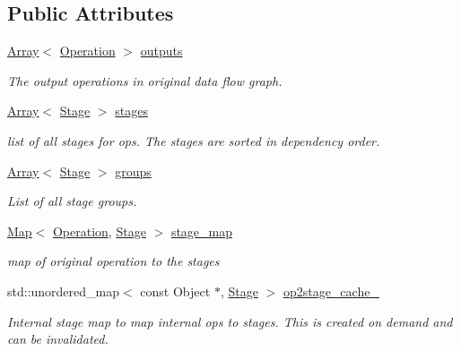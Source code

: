 \subsection*{Public Attributes}
\begin{DoxyCompactItemize}
\item 
\hyperlink{classtvm_1_1Array}{Array}$<$ \hyperlink{classtvm_1_1te_1_1Operation}{Operation} $>$ \hyperlink{classtvm_1_1te_1_1ScheduleNode_a27b0f687f7b20fcc6416a49e041712d8}{outputs}
\begin{DoxyCompactList}\small\item\em The output operations in original data flow graph. \end{DoxyCompactList}\item 
\hyperlink{classtvm_1_1Array}{Array}$<$ \hyperlink{classtvm_1_1te_1_1Stage}{Stage} $>$ \hyperlink{classtvm_1_1te_1_1ScheduleNode_ab5649969db603d6b7b4d155c0d09cdd5}{stages}
\begin{DoxyCompactList}\small\item\em list of all stages for ops. The stages are sorted in dependency order. \end{DoxyCompactList}\item 
\hyperlink{classtvm_1_1Array}{Array}$<$ \hyperlink{classtvm_1_1te_1_1Stage}{Stage} $>$ \hyperlink{classtvm_1_1te_1_1ScheduleNode_ab2020fcfbb6fd3c216bb09455697452f}{groups}
\begin{DoxyCompactList}\small\item\em List of all stage groups. \end{DoxyCompactList}\item 
\hyperlink{classtvm_1_1Map}{Map}$<$ \hyperlink{classtvm_1_1te_1_1Operation}{Operation}, \hyperlink{classtvm_1_1te_1_1Stage}{Stage} $>$ \hyperlink{classtvm_1_1te_1_1ScheduleNode_a612223aec2751cbd035a18c9e5453085}{stage\+\_\+map}
\begin{DoxyCompactList}\small\item\em map of original operation to the stages \end{DoxyCompactList}\item 
std\+::unordered\+\_\+map$<$ const Object $\ast$, \hyperlink{classtvm_1_1te_1_1Stage}{Stage} $>$ \hyperlink{classtvm_1_1te_1_1ScheduleNode_adbc8bfb6812add2173dcc7a6adb85d5c}{op2stage\+\_\+cache\+\_\+}
\begin{DoxyCompactList}\small\item\em Internal stage map to map internal ops to stages. This is created on demand and can be invalidated. \end{DoxyCompactList}\end{DoxyCompactItemize}
